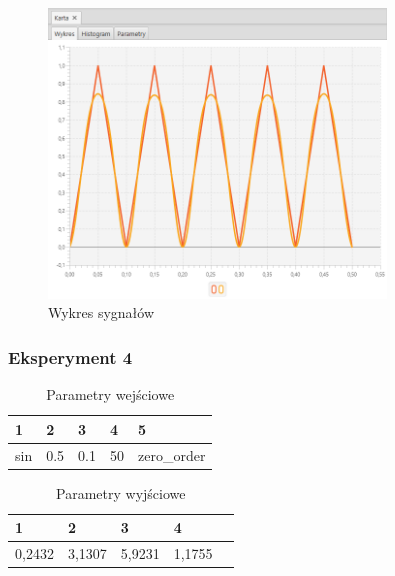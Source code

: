 \documentclass[12pt]{article}
\begin{document}
{{{                \begin{figure}[H]
                    \centering
                    \includegraphics[width=0.8\textwidth]{img/result/experiment2/03/data_draw_original_chart_recon_output_130358.png}
                    \caption{Wykres sygnałów}
                \end{figure}
            }
            \newpage

            \subsubsection{Eksperyment 4} {
                \begin{table}[H]
                    \centering
                    \begin{tabular}{|l|l|l|l|l|}
                        \hline
                        1 & 2 & 3 & 4 & 5   \\ \hline
                        sin & 0.5 & 0.1 & 50 & zero\_order  \\ \hline
                    \end{tabular}
                    \caption{Parametry wejściowe}
                \end{table}

                \begin{table}[H]
                    \centering
                    \begin{tabular}{|l|l|l|l|l|}
                        \hline
                        1 & 2 & 3 & 4   \\ \hline
                        0,2432 & 3,1307 & 5,9231 & 1,1755 \\ \hline
                    \end{tabular}
                    \caption{Parametry wyjściowe}
                \end{table}


}}}
\end{document}
